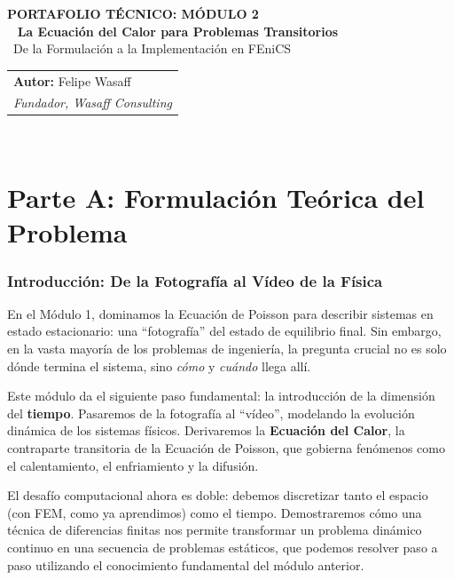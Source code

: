 \documentclass[11pt, a4paper]{article}
\begin{document}
\sffamily
{\color{WasaffCopper} \large \textbf{PORTAFOLIO TÉCNICO: MÓDULO 2}}\\
\
{\color{WasaffNavy} \huge \textbf{La Ecuación del Calor para Problemas Transitorios}}\\
\
{\Large De la Formulación a la Implementación en FEniCS}\\
\vspace{1cm}
\rmfamily
\begin{tabular}{@{}p{14cm}}
    \textbf{Autor:} Felipe Wasaff \\
    \textit{Fundador, Wasaff Consulting} \\
\end{tabular}
\
\hrulefill
\
\tableofcontents
\
\hrulefill
\
\newpage

\part*{Parte A: Formulación Teórica del Problema}

\section{Introducción: De la Fotografía al Vídeo de la Física}
En el Módulo 1, dominamos la Ecuación de Poisson para describir sistemas en estado estacionario: una ``fotografía'' del estado de equilibrio final. Sin embargo, en la vasta mayoría de los problemas de ingeniería, la pregunta crucial no es solo dónde termina el sistema, sino \textit{cómo} y \textit{cuándo} llega allí.

Este módulo da el siguiente paso fundamental: la introducción de la dimensión del \textbf{tiempo}. Pasaremos de la fotografía al ``vídeo'', modelando la evolución dinámica de los sistemas físicos. Derivaremos la \textbf{Ecuación del Calor}, la contraparte transitoria de la Ecuación de Poisson, que gobierna fenómenos como el calentamiento, el enfriamiento y la difusión.

El desafío computacional ahora es doble: debemos discretizar tanto el espacio (con FEM, como ya aprendimos) como el tiempo. Demostraremos cómo una técnica de diferencias finitas nos permite transformar un problema dinámico continuo en una secuencia de problemas estáticos, que podemos resolver paso a paso utilizando el conocimiento fundamental del módulo anterior.
\end{document}
